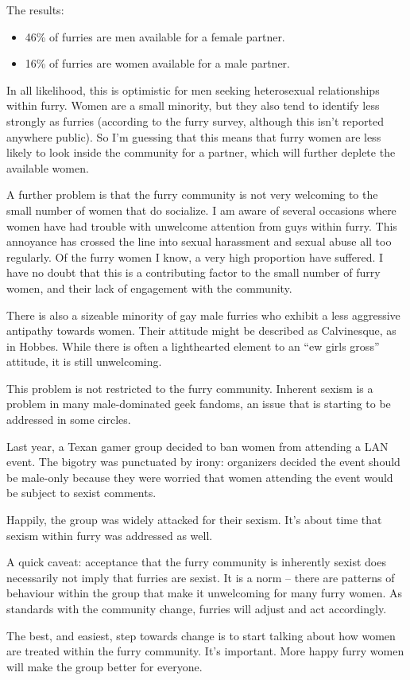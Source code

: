 The results:

\begin{itemize}
  \item 46\% of furries are men available for a female partner.
  \item 16\% of furries are women available for a male partner.
\end{itemize}

In all likelihood, this is optimistic for men seeking heterosexual relationships within furry. Women are a small minority, but they also tend to identify less strongly as furries (according to the furry survey, although this isn’t reported anywhere public). So I’m guessing that this means that furry women are less likely to look inside the community for a partner, which will further deplete the available women.

A further problem is that the furry community is not very welcoming to the small number of women that do socialize. I am aware of several occasions where women have had trouble with unwelcome attention from guys within furry. This annoyance has crossed the line into sexual harassment and sexual abuse all too regularly. Of the furry women I know, a very high proportion have suffered. I have no doubt that this is a contributing factor to the small number of furry women, and their lack of engagement with the community.

There is also a sizeable minority of gay male furries who exhibit a less aggressive antipathy towards women. Their attitude might be described as Calvinesque, as in Hobbes. While there is often a lighthearted element to an ``ew girls gross'' attitude, it is still unwelcoming.

This problem is not restricted to the furry community. Inherent sexism is a problem in many male-dominated geek fandoms, an issue that is starting to be addressed in some circles.

Last year, a Texan gamer group decided to ban women from attending a LAN event. The bigotry was punctuated by irony: organizers decided the event should be male-only because they were worried that women attending the event would be subject to sexist comments.

Happily, the group was widely attacked for their sexism. It’s about time that sexism within furry was addressed as well.

A quick caveat: acceptance that the furry community is inherently sexist does necessarily not imply that furries are sexist. It is a norm -- there are patterns of behaviour within the group that make it unwelcoming for many furry women. As standards with the community change, furries will adjust and act accordingly.

The best, and easiest, step towards change is to start talking about how women are treated within the furry community. It’s important. More happy furry women will make the group better for everyone.
